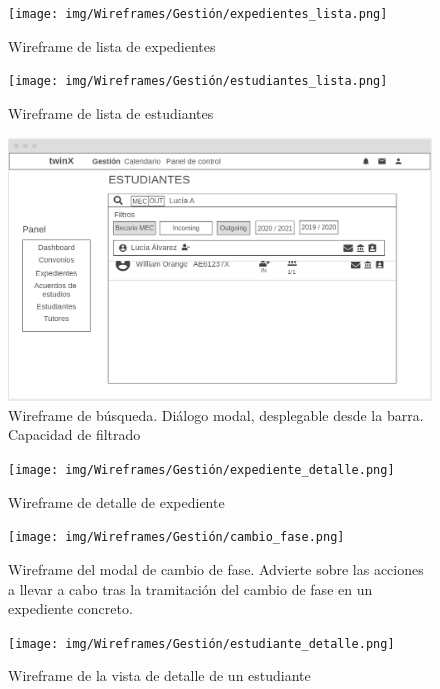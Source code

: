 \begin{figure}
	\centering
	\texttt{[image: img/Wireframes/Gestión/expedientes\_lista.png]}
	\caption{Wireframe de lista de expedientes}
	\label{fig:expedientes_listaWF}
\end{figure}

\begin{figure}
	\centering
	\texttt{[image: img/Wireframes/Gestión/estudiantes\_lista.png]}
	\caption{Wireframe de lista de estudiantes}
	\label{fig:estudiantes_listaWF}
\end{figure}

\begin{figure}
	\centering
	\includegraphics[width=\textwidth]{img/Wireframes/Gestión/búsqueda.png}
	\caption[Wireframe de búsqueda]{Wireframe de búsqueda. Diálogo modal, desplegable desde la barra. Capacidad de filtrado}
	\label{fig:busquedaWF}
\end{figure}

\begin{figure}
	\centering
	\texttt{[image: img/Wireframes/Gestión/expediente\_detalle.png]}
	\caption{Wireframe de detalle de expediente}
	\label{fig:expediente_detalleWF}
\end{figure}

\begin{figure}
	\centering
	\texttt{[image: img/Wireframes/Gestión/cambio\_fase.png]}
	\caption[Wireframe del modal de cambio de fase]{Wireframe del modal de cambio de fase. Advierte sobre las acciones a llevar a cabo tras la tramitación del cambio de fase en un expediente concreto.}
	\label{fig:cambio_faseWF}
\end{figure}

\begin{figure}
	\centering
	\texttt{[image: img/Wireframes/Gestión/estudiante\_detalle.png]}
	\caption{Wireframe de la vista de detalle de un estudiante}
	\label{fig:estudiante_detalleWF}
\end{figure}

